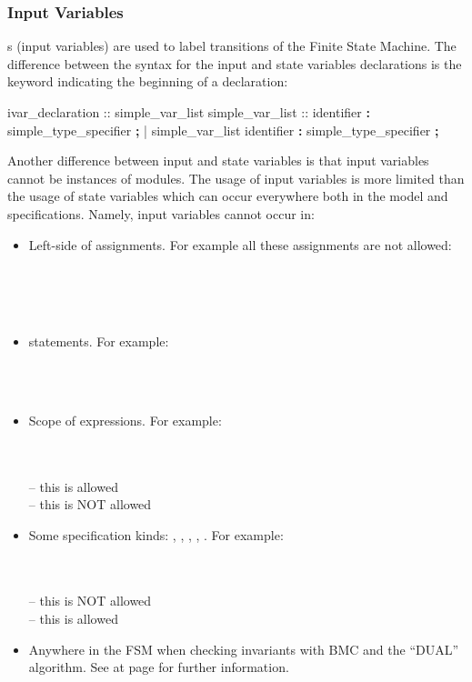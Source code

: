 \subsubsection{Input Variables}
\label{Input Variables}
%
s (input variables) are used to label transitions of the
Finite State Machine. The difference between the syntax for the input
and state variables declarations is the keyword indicating the
beginning of a declaration:
%
\begin{Grammar}
ivar_declaration ::  simple_var_list
simple_var_list ::
        identifier \textbf{:} simple_type_specifier \textbf{;}
      | simple_var_list identifier \textbf{:} simple_type_specifier \textbf{;}
\end{Grammar}
%
Another difference between input and state variables is that input
variables cannot be instances of modules.
%
The usage of input variables is more limited than the usage of state
variables which can occur everywhere both in the model and
specifications.
%
Namely, input variables cannot occur in:

\begin{itemize}
\item Left-side of assignments. For example all these assignments 
  are not allowed:

  \\
  \\
  \\

\item {} statements. For example:

  \\
  \\

\item Scope of  expressions. For example:

  \\
  \\
   -- this is allowed\\
   -- this is NOT allowed

\item Some specification kinds: , ,
      , , . For example:

  \\
  \\
   -- this is NOT allowed\\
   -- this is allowed


\item Anywhere in the FSM when checking invariants with BMC and the
  ``DUAL'' algorithm. See at page \pageref{bmc::dual} for further
  information.

\end{itemize}


